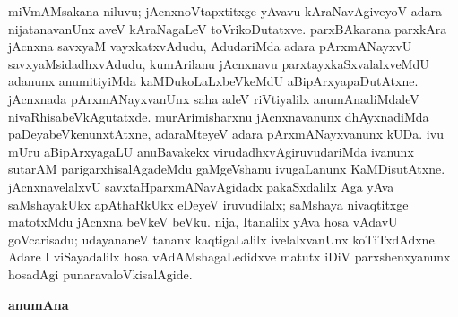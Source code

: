 miVmAMsakana niluvu; jAcnxnoV\-tapxtitxge yAvavu kAraNavAgiveyoV adara nijatanavanUnx aveV kAraNagaLeV toVrikoDu\-tatxve. parxBAkarana parxkAra jAcnxna savxyaM vayxkatxvAdudu, AdudariMda adara pArxmANayxvU savxyaMsidadhxvAdudu, kumArilanu jAcnxnavu parxtayxkaSxvalalxveMdU adanunx anumiti\-yiMda kaMDukoLaLxbeVkeMdU aBipArxyapaDutAtxne. jAcnxnada pArxmANayxvanUnx saha adeV riVti\-yalilx anumAnadiMdaleV nivaRhisabeVkAgutatxde. murArimisharxnu jAcnxnavanunx dhAyxna\-diMda paDeyabeVkenunxtAtxne, adaraMteyeV adara pArxmANayxvanunx kUDa. ivu mUru aBipArxyagaLU anuBavakekx virudadhxvAgiruvudariMda ivanunx sutarAM parigarxhisa\-lAga\-deMdu gaMgeVshanu ivugaLanunx KaMDisutAtxne. jAcnxnavelalxvU savxtaHparxmANavAgidadx pakaSx\-dalilx Aga yAva saMshayakUkx apAthaRkUkx eDeyeV iruvudilalx; saMshaya nivaqtitxge matotxMdu jAcnxna beVkeV beVku. nija, Itanalilx yAva hosa vAdavU goVcarisadu; udayananeV tananx kaqtigaLalilx ivelalxvanUnx koTiTxdAdxne. Adare I viSayadalilx hosa vAdAMshagaLedidxve matutx iDiV parxshenxyanunx hosadAgi punaravaloVkisalAgide.

\newpage

\begin{center}
{\Large\bf anumAna}
\end{center}

